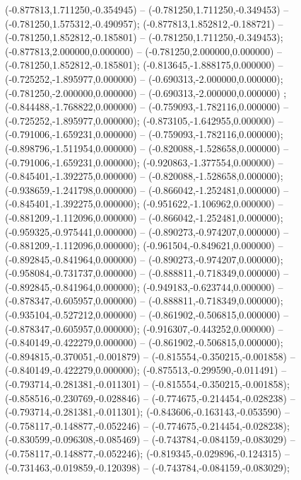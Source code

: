  (-0.877813,1.711250,-0.354945) -- (-0.781250,1.711250,-0.349453) -- (-0.781250,1.575312,-0.490957);
 (-0.877813,1.852812,-0.188721) -- (-0.781250,1.852812,-0.185801) -- (-0.781250,1.711250,-0.349453);
 (-0.877813,2.000000,0.000000) -- (-0.781250,2.000000,0.000000) -- (-0.781250,1.852812,-0.185801);
 (-0.813645,-1.888175,0.000000) -- (-0.725252,-1.895977,0.000000) -- (-0.690313,-2.000000,0.000000);
 (-0.781250,-2.000000,0.000000) -- (-0.690313,-2.000000,0.000000) ;
 (-0.844488,-1.768822,0.000000) -- (-0.759093,-1.782116,0.000000) -- (-0.725252,-1.895977,0.000000);
 (-0.873105,-1.642955,0.000000) -- (-0.791006,-1.659231,0.000000) -- (-0.759093,-1.782116,0.000000);
 (-0.898796,-1.511954,0.000000) -- (-0.820088,-1.528658,0.000000) -- (-0.791006,-1.659231,0.000000);
 (-0.920863,-1.377554,0.000000) -- (-0.845401,-1.392275,0.000000) -- (-0.820088,-1.528658,0.000000);
 (-0.938659,-1.241798,0.000000) -- (-0.866042,-1.252481,0.000000) -- (-0.845401,-1.392275,0.000000);
 (-0.951622,-1.106962,0.000000) -- (-0.881209,-1.112096,0.000000) -- (-0.866042,-1.252481,0.000000);
 (-0.959325,-0.975441,0.000000) -- (-0.890273,-0.974207,0.000000) -- (-0.881209,-1.112096,0.000000);
 (-0.961504,-0.849621,0.000000) -- (-0.892845,-0.841964,0.000000) -- (-0.890273,-0.974207,0.000000);
 (-0.958084,-0.731737,0.000000) -- (-0.888811,-0.718349,0.000000) -- (-0.892845,-0.841964,0.000000);
 (-0.949183,-0.623744,0.000000) -- (-0.878347,-0.605957,0.000000) -- (-0.888811,-0.718349,0.000000);
 (-0.935104,-0.527212,0.000000) -- (-0.861902,-0.506815,0.000000) -- (-0.878347,-0.605957,0.000000);
 (-0.916307,-0.443252,0.000000) -- (-0.840149,-0.422279,0.000000) -- (-0.861902,-0.506815,0.000000);
 (-0.894815,-0.370051,-0.001879) -- (-0.815554,-0.350215,-0.001858) -- (-0.840149,-0.422279,0.000000);
 (-0.875513,-0.299590,-0.011491) -- (-0.793714,-0.281381,-0.011301) -- (-0.815554,-0.350215,-0.001858);
 (-0.858516,-0.230769,-0.028846) -- (-0.774675,-0.214454,-0.028238) -- (-0.793714,-0.281381,-0.011301);
 (-0.843606,-0.163143,-0.053590) -- (-0.758117,-0.148877,-0.052246) -- (-0.774675,-0.214454,-0.028238);
 (-0.830599,-0.096308,-0.085469) -- (-0.743784,-0.084159,-0.083029) -- (-0.758117,-0.148877,-0.052246);
 (-0.819345,-0.029896,-0.124315) -- (-0.731463,-0.019859,-0.120398) -- (-0.743784,-0.084159,-0.083029);
